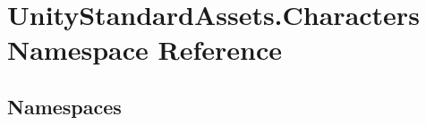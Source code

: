 \hypertarget{namespace_unity_standard_assets_1_1_characters}{}\section{Unity\+Standard\+Assets.\+Characters Namespace Reference}
\label{namespace_unity_standard_assets_1_1_characters}
\subsection*{Namespaces}
\begin{DoxyCompactItemize}
\end{DoxyCompactItemize}
